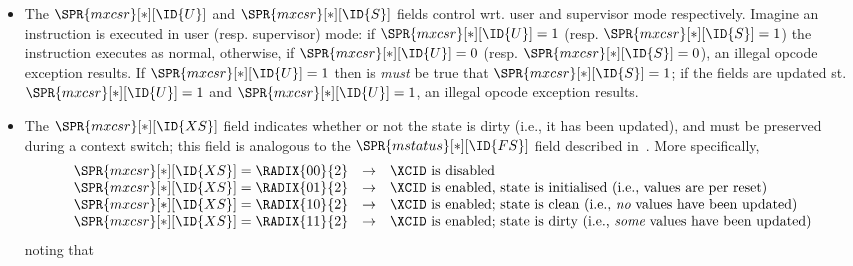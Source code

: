 \begin{itemize}

\item The 
      $\SPR{mxcsr}[*][\ID{U}]$
      and
      $\SPR{mxcsr}[*][\ID{S}]$
      fields control \XCID wrt. user and supervisor mode respectively.  
      Imagine an \XCID instruction is executed in 
      user                         (resp. supervisor) 
      mode: if 
      $\SPR{mxcsr}[*][\ID{U}] = 1$ (resp. $\SPR{mxcsr}[*][\ID{S}] = 1$)
      the instruction executes as normal, otherwise, if
      $\SPR{mxcsr}[*][\ID{U}] = 0$ (resp. $\SPR{mxcsr}[*][\ID{S}] = 0$),
      an illegal opcode exception results.
      If 
      $\SPR{mxcsr}[*][\ID{U}] = 1$
      then is {\em must} be true that
      $\SPR{mxcsr}[*][\ID{S}] = 1$;
      if the fields are updated st.
      $\SPR{mxcsr}[*][\ID{U}] = 1$
      and
      $\SPR{mxcsr}[*][\ID{U}] = 1$,
      an illegal opcode exception results.

\item The 
      $\SPR{mxcsr}[*][\ID{XS}]$
      field indicates whether or not the \XCID state is dirty (i.e., it
      has been updated), and must be preserved during a context switch;
      this field is analogous to the 
      $\SPR{mstatus}[*][\ID{FS}]$
      field described in~\cite[Section 3.1.6.5]{SCARV:RV:ISA:II:17}.
      More specifically,
      \[
      \begin{array}{l@{\;}c@{\;}rcl}
      \SPR{mxcsr}[*][\ID{XS}] &=& \RADIX{00}{2} &\rightarrow& \mbox{\XCID is disabled                                                                  } \\
      \SPR{mxcsr}[*][\ID{XS}] &=& \RADIX{01}{2} &\rightarrow& \mbox{\XCID is  enabled, state is initialised (i.e.,            values are per reset)    } \\
      \SPR{mxcsr}[*][\ID{XS}] &=& \RADIX{10}{2} &\rightarrow& \mbox{\XCID is  enabled; state is clean       (i.e., {\em   no} values have been updated)} \\
      \SPR{mxcsr}[*][\ID{XS}] &=& \RADIX{11}{2} &\rightarrow& \mbox{\XCID is  enabled; state is dirty       (i.e., {\em some} values have been updated)} \\
      \end{array}
      \]
      noting that


\end{itemize}
